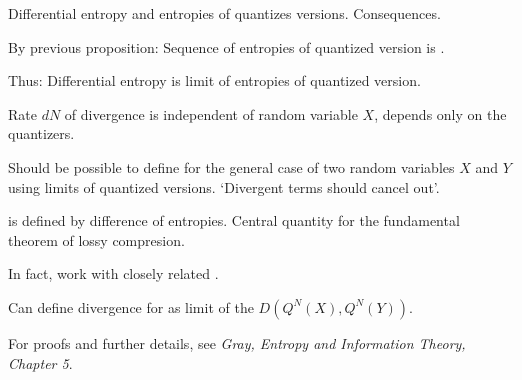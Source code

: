 \begin{frame}{Differential entropy and entropies of quantizes versions. Consequences. }
\bit
\item By previous proposition: Sequence of entropies of quantized version is . 
\item Thus: Differential entropy is  limit of entropies of quantized version.
\item {} Rate $dN$ of divergence is independent of random variable $X$, depends only 
on the  quantizers.
\eit
{}
\bit
\item Should be possible to define  for the general case of two random variables $X$ and $Y$ using 
limits of quantized versions. `Divergent terms should cancel out'. 
\eit
{}
\bit
\item {} is defined by difference of entropies. Central quantity for the fundamental theorem of lossy compresion.
\item In fact, work with closely related . 
\item Can define divergence for  as limit of the $D(Q^N(X),Q^N(Y))$. 
\item For proofs and further details, see \textit{Gray, Entropy and Information Theory, Chapter 5}. 
\eit
\end{frame}









